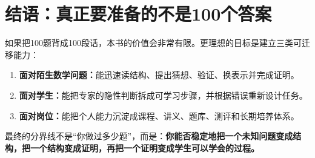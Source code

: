 \documentclass[11pt,openany]{ctexbook}
\begin{document}
\chapter*{结语：真正要准备的不是100个答案}
如果把100题背成100段话，本书的价值会非常有限。更理想的目标是建立三类可迁移能力：
\begin{enumerate}
\item \textbf{面对陌生数学问题：}能迅速读结构、提出猜想、验证、换表示并完成证明。
\item \textbf{面对学生：}能把专家的隐性判断拆成可学习步骤，并根据错误重新设计任务。
\item \textbf{面对岗位：}能把个人能力沉淀成课程、讲义、题库、测评和长期培养体系。
\end{enumerate}
最终的分界线不是“你做过多少题”，而是：\textbf{你能否稳定地把一个未知问题变成结构，把一个结构变成证明，再把一个证明变成学生可以学会的过程。}

\backmatter
\end{document}

